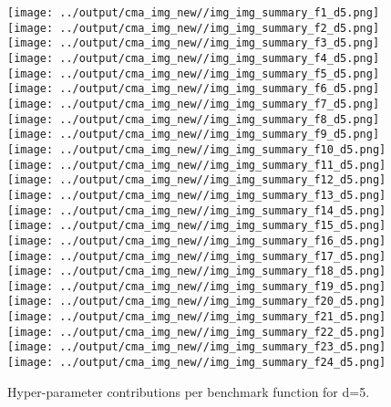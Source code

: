 \begin{figure}[t]
\centering
	\texttt{[image: ../output/cma\_img\_new//img\_img\_summary\_f1\_d5.png]}
	\texttt{[image: ../output/cma\_img\_new//img\_img\_summary\_f2\_d5.png]}
	\texttt{[image: ../output/cma\_img\_new//img\_img\_summary\_f3\_d5.png]}
	\texttt{[image: ../output/cma\_img\_new//img\_img\_summary\_f4\_d5.png]}
	\texttt{[image: ../output/cma\_img\_new//img\_img\_summary\_f5\_d5.png]}
	\texttt{[image: ../output/cma\_img\_new//img\_img\_summary\_f6\_d5.png]}
	\texttt{[image: ../output/cma\_img\_new//img\_img\_summary\_f7\_d5.png]}
	\texttt{[image: ../output/cma\_img\_new//img\_img\_summary\_f8\_d5.png]}
	\texttt{[image: ../output/cma\_img\_new//img\_img\_summary\_f9\_d5.png]}
	\texttt{[image: ../output/cma\_img\_new//img\_img\_summary\_f10\_d5.png]}
	\texttt{[image: ../output/cma\_img\_new//img\_img\_summary\_f11\_d5.png]}
	\texttt{[image: ../output/cma\_img\_new//img\_img\_summary\_f12\_d5.png]}
	\texttt{[image: ../output/cma\_img\_new//img\_img\_summary\_f13\_d5.png]}
	\texttt{[image: ../output/cma\_img\_new//img\_img\_summary\_f14\_d5.png]}
	\texttt{[image: ../output/cma\_img\_new//img\_img\_summary\_f15\_d5.png]}
	\texttt{[image: ../output/cma\_img\_new//img\_img\_summary\_f16\_d5.png]}
	\texttt{[image: ../output/cma\_img\_new//img\_img\_summary\_f17\_d5.png]}
	\texttt{[image: ../output/cma\_img\_new//img\_img\_summary\_f18\_d5.png]}
	\texttt{[image: ../output/cma\_img\_new//img\_img\_summary\_f19\_d5.png]}
	\texttt{[image: ../output/cma\_img\_new//img\_img\_summary\_f20\_d5.png]}
	\texttt{[image: ../output/cma\_img\_new//img\_img\_summary\_f21\_d5.png]}
	\texttt{[image: ../output/cma\_img\_new//img\_img\_summary\_f22\_d5.png]}
	\texttt{[image: ../output/cma\_img\_new//img\_img\_summary\_f23\_d5.png]}
	\texttt{[image: ../output/cma\_img\_new//img\_img\_summary\_f24\_d5.png]}
\caption{Hyper-parameter contributions per benchmark function for d=5. \label{fig:shapxplaind5}}

\end{figure}

